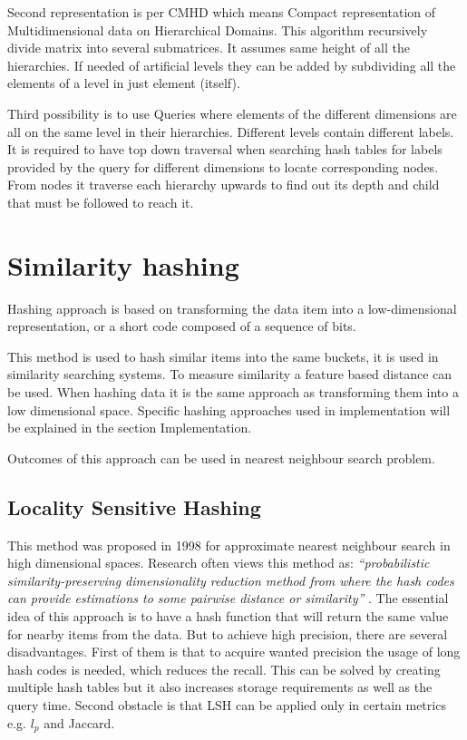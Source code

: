 Second representation is per CMHD which means Compact representation of Multidimensional data on Hierarchical Domains. This algorithm recursively divide matrix into several submatrices. It assumes same height of all the hierarchies. If needed of artificial levels they can be added by subdividing all the elements of a level in just element (itself).

Third possibility is to use Queries where elements of the different dimensions are all on the same level in their hierarchies. Different levels contain different labels. It is required to have top down traversal when searching hash tables for labels provided by the query for different dimensions to locate corresponding nodes. From nodes it traverse each hierarchy upwards to find out its depth and child that must be followed to reach it. \cite{efficientRepre}
\section{Similarity hashing}\label{similHashing}
Hashing approach is based on transforming the data item into a low-dimensional representation, or a short code composed of a sequence of bits.

This method is used to hash similar items into the same buckets, it is used in similarity searching systems. To measure similarity a feature based distance can be used. When hashing data it is the same approach as transforming them into a low dimensional space. Specific hashing approaches used in implementation will be explained in the section Implementation.

Outcomes of this approach can be used in nearest neighbour search problem.

\subsection{Locality Sensitive Hashing}\label{LSH}
This method was proposed in 1998 for approximate nearest neighbour search in high dimensional spaces. Research often views this method as: \textit{``probabilistic similarity-preserving dimensionality reduction method from where the hash codes can provide estimations to some pairwise distance or similarity''}  \cite{hashing}. The essential idea of this approach is to have a hash function that will return the same value for nearby items from the data. But to achieve high precision, there are several disadvantages. First of them is that to acquire wanted precision the usage of long hash codes is needed, which reduces the recall. This can be solved by creating multiple hash tables but it also increases storage requirements as well as the query time. Second obstacle is that LSH can be applied only in certain metrics e.g. $l_p$ and Jaccard. 

